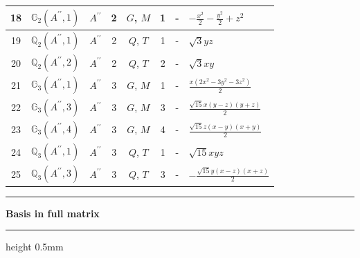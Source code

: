 \documentclass[fleqn,10pt,landscape]{jsarticle}
\begin{document}
\begin{longtable}[l]{clcccccl}
18 & $\mathbb{G}_{2}(A^{\prime\prime},1)$ & $A^{\prime\prime}$ & 2 & $G$, $M$ & 1 & - & $- \frac{x^{2}}{2} - \frac{y^{2}}{2} + z^{2}$ \\ \hline
19 & $\mathbb{Q}_{2}(A^{\prime\prime},1)$ & $A^{\prime\prime}$ & 2 & $Q$, $T$ & 1 & - & $\sqrt{3} y z$ \\ \hline
20 & $\mathbb{Q}_{2}(A^{\prime\prime},2)$ & $A^{\prime\prime}$ & 2 & $Q$, $T$ & 2 & - & $\sqrt{3} x y$ \\ \hline
21 & $\mathbb{G}_{3}(A^{\prime\prime},1)$ & $A^{\prime\prime}$ & 3 & $G$, $M$ & 1 & - & $\frac{x \left(2 x^{2} - 3 y^{2} - 3 z^{2}\right)}{2}$ \\ \hline
22 & $\mathbb{G}_{3}(A^{\prime\prime},3)$ & $A^{\prime\prime}$ & 3 & $G$, $M$ & 3 & - & $\frac{\sqrt{15} x \left(y - z\right) \left(y + z\right)}{2}$ \\ \hline
23 & $\mathbb{G}_{3}(A^{\prime\prime},4)$ & $A^{\prime\prime}$ & 3 & $G$, $M$ & 4 & - & $\frac{\sqrt{15} z \left(x - y\right) \left(x + y\right)}{2}$ \\ \hline
24 & $\mathbb{Q}_{3}(A^{\prime\prime},1)$ & $A^{\prime\prime}$ & 3 & $Q$, $T$ & 1 & - & $\sqrt{15} x y z$ \\ \hline
25 & $\mathbb{Q}_{3}(A^{\prime\prime},3)$ & $A^{\prime\prime}$ & 3 & $Q$, $T$ & 3 & - & $- \frac{\sqrt{15} y \left(x - z\right) \left(x + z\right)}{2}$ \\
\end{longtable}
\vspace{5mm}
\noindent \rule[0.5mm]{5mm}{0.5mm}\hspace{3mm}\textbf{Basis in full matrix}\hspace{3mm}\leaders\hrule height 0.5mm\hfill\kern0pt
\vspace{3mm}
\end{document}
